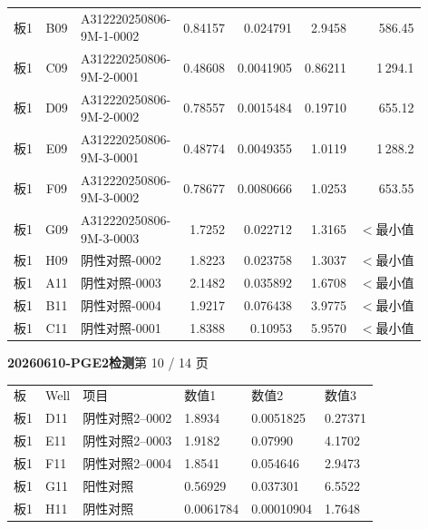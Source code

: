 \documentclass[UTF8,10pt,a4paper,fontset=fandol]{ctexart}
\begin{document}
\begin{tabular}{@{}c c p{3.55cm} r r r r@{}}
板1 & B09 & \shortstack[l]{A312220250806-\\9M-1-0002} & 0.84157 & 0.024791 & 2.9458 & 586.45\\
板1 & C09 & \shortstack[l]{A312220250806-\\9M-2-0001} & 0.48608 & 0.0041905 & 0.86211 & 1\,294.1\\
板1 & D09 & \shortstack[l]{A312220250806-\\9M-2-0002} & 0.78557 & 0.0015484 & 0.19710 & 655.12\\
板1 & E09 & \shortstack[l]{A312220250806-\\9M-3-0001} & 0.48774 & 0.0049355 & 1.0119 & 1\,288.2\\
板1 & F09 & \shortstack[l]{A312220250806-\\9M-3-0002} & 0.78677 & 0.0080666 & 1.0253 & 653.55\\
板1 & G09 & \shortstack[l]{A312220250806-\\9M-3-0003} & 1.7252 & 0.022712 & 1.3165 & $<$最小值\\
板1 & H09 & 阴性对照-0002 & 1.8223 & 0.023758 & 1.3037 & $<$最小值\\
板1 & A11 & 阴性对照-0003 & 2.1482 & 0.035892 & 1.6708 & $<$最小值\\
板1 & B11 & 阴性对照-0004 & 1.9217 & 0.076438 & 3.9775 & $<$最小值\\
板1 & C11 & 阴性对照-0001 & 1.8388 & 0.10953 & 5.9570 & $<$最小值\\
\end{tabular}

\newpage

\noindent\textbf{20260610-PGE2检测}\hfill 第 10 / 14 页

\vspace{0.5em}

\begin{tabular}{@{}llllll@{}}
\small
板 & Well & 项目 & 数值1 & 数值2 & 数值3 \\
板1 & D11 & 阴性对照2--0002 & 1.8934 & 0.0051825 & 0.27371 \\
板1 & E11 & 阴性对照2--0003 & 1.9182 & 0.07990 & 4.1702 \\
板1 & F11 & 阴性对照2--0004 & 1.8541 & 0.054646 & 2.9473 \\
板1 & G11 & 阳性对照 & 0.56929 & 0.037301 & 6.5522 \\
板1 & H11 & 阴性对照 & 0.0061784 & 0.00010904 & 1.7648 \\
\end{tabular}
\end{document}
